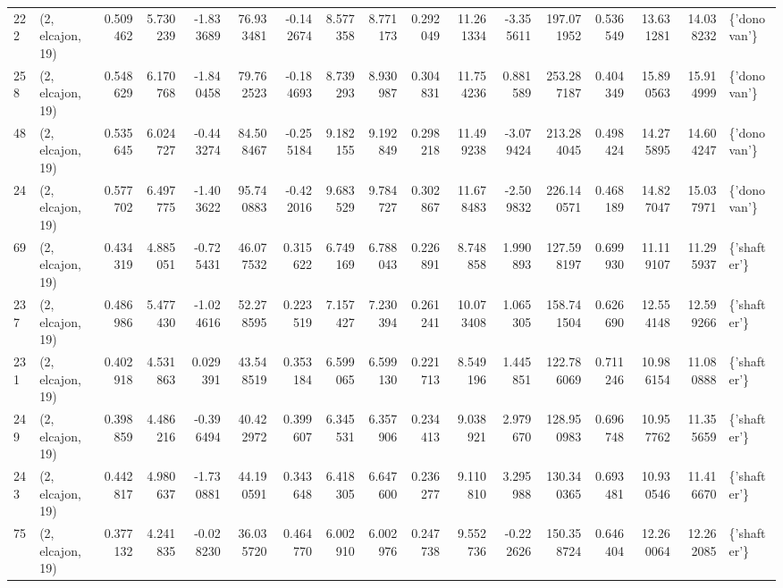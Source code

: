 \begin{tabular}{llrrrrrrrrrrrrrrl}
222 &  (2, elcajon, 19) &   0.509462 &   5.730239 &  -1.833689 &    76.933481 &  -0.142674 &   8.577358 &   8.771173 &  0.292049 &  11.261334 &  -3.355611 &   197.071952 &   0.536549 &  13.631281 &  14.038232 &  \{'donovan'\} \\
258 &  (2, elcajon, 19) &   0.548629 &   6.170768 &  -1.840458 &    79.762523 &  -0.184693 &   8.739293 &   8.930987 &  0.304831 &  11.754236 &   0.881589 &   253.287187 &   0.404349 &  15.890563 &  15.914999 &  \{'donovan'\} \\
48  &  (2, elcajon, 19) &   0.535645 &   6.024727 &  -0.443274 &    84.508467 &  -0.255184 &   9.182155 &   9.192849 &  0.298218 &  11.499238 &  -3.079424 &   213.284045 &   0.498424 &  14.275895 &  14.604247 &  \{'donovan'\} \\
24  &  (2, elcajon, 19) &   0.577702 &   6.497775 &  -1.403622 &    95.740883 &  -0.422016 &   9.683529 &   9.784727 &  0.302867 &  11.678483 &  -2.509832 &   226.140571 &   0.468189 &  14.827047 &  15.037971 &  \{'donovan'\} \\
69  &  (2, elcajon, 19) &   0.434319 &   4.885051 &  -0.725431 &    46.077532 &   0.315622 &   6.749169 &   6.788043 &  0.226891 &   8.748858 &   1.990893 &   127.598197 &   0.699930 &  11.119107 &  11.295937 &  \{'shafter'\} \\
237 &  (2, elcajon, 19) &   0.486986 &   5.477430 &  -1.024616 &    52.278595 &   0.223519 &   7.157427 &   7.230394 &  0.261241 &  10.073408 &   1.065305 &   158.741504 &   0.626690 &  12.554148 &  12.599266 &  \{'shafter'\} \\
231 &  (2, elcajon, 19) &   0.402918 &   4.531863 &   0.029391 &    43.548519 &   0.353184 &   6.599065 &   6.599130 &  0.221713 &   8.549196 &   1.445851 &   122.786069 &   0.711246 &  10.986154 &  11.080888 &  \{'shafter'\} \\
249 &  (2, elcajon, 19) &   0.398859 &   4.486216 &  -0.396494 &    40.422972 &   0.399607 &   6.345531 &   6.357906 &  0.234413 &   9.038921 &   2.979670 &   128.950983 &   0.696748 &  10.957762 &  11.355659 &  \{'shafter'\} \\
243 &  (2, elcajon, 19) &   0.442817 &   4.980637 &  -1.730881 &    44.190591 &   0.343648 &   6.418305 &   6.647600 &  0.236277 &   9.110810 &   3.295988 &   130.340365 &   0.693481 &  10.930546 &  11.416670 &  \{'shafter'\} \\
75  &  (2, elcajon, 19) &   0.377132 &   4.241835 &  -0.028230 &    36.035720 &   0.464770 &   6.002910 &   6.002976 &  0.247738 &   9.552736 &  -0.222626 &   150.358724 &   0.646404 &  12.260064 &  12.262085 &  \{'shafter'\} \\

\end{tabular}
